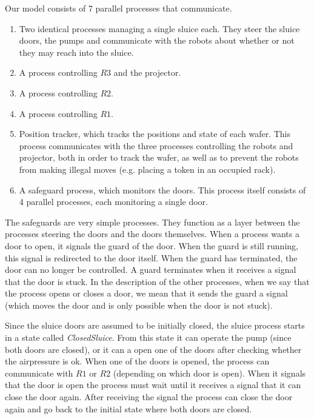 
Our model consists of 7 parallel processes that communicate.
\begin{enumerate}
 \item Two identical processes managing a single sluice each. They steer the sluice doors, the pumps and communicate with the robots about whether or not they may reach into the sluice.
 \item A process controlling $R3$ and the projector.
 \item A process controlling $R2$.
 \item A process controlling $R1$.
 \item Position tracker, which tracks the positions and state of each wafer. This process communicates with the three processes controlling the robots and projector, both in order to track the wafer, as well as to prevent the robots from making illegal moves (e.g. placing a token in an occupied rack).
 \item A safeguard process, which monitors the doors. This process itself consists of 4 parallel processes, each monitoring a single door.
\end{enumerate}

The safeguards are very simple processes. They function as a layer between the processes steering the doors and the doors themselves. When a process wants a door to open, it signals the guard of the door. When the guard is still running, this signal is redirected to the door itself. When the guard has terminated, the door can no longer be controlled. A guard terminates when it receives a signal that the door is stuck. In the description of the other processes, when we say that the process opens or closes a door, we mean that it sends the guard a signal (which moves the door and is only possible when the door is not stuck).

Since the sluice doors are assumed to be initially closed, the sluice process starts in a state called \emph{ClosedSluice}. From this state it can operate the pump (since both doors are closed), or it can a open one of the doors after checking whether the airpressure is ok. When one of the doors is opened, the process can communicate with $R1$ or $R2$ (depending on which door is open). When it signals that the door is open the process must wait until it receives a signal that it can close the door again. After receiving the signal the process can close the door again and go back to the initial state where both doors are closed.


